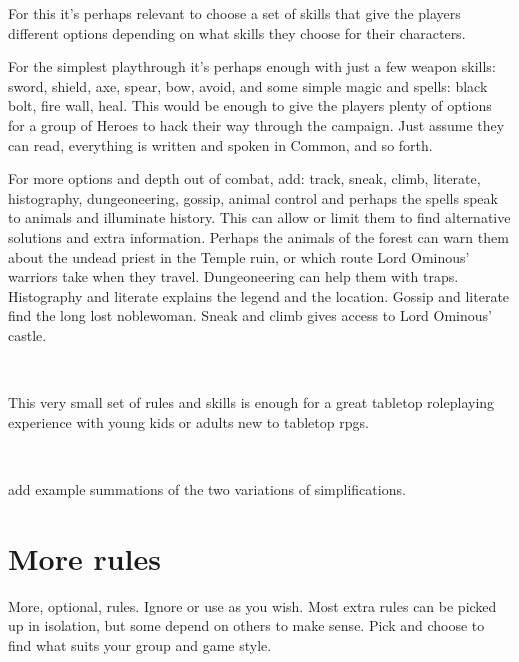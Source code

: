 For this it's perhaps relevant to choose a set of skills that give the players different options depending on what skills they choose for their characters. 

For the simplest playthrough it's perhaps enough with just a few weapon skills: sword, shield, axe, spear, bow, avoid, and some simple magic and spells: black bolt, fire wall, heal. This would be enough to give the players plenty of options for a group of Heroes to hack their way through the campaign. Just assume they can read, everything is written and spoken in Common, and so forth.

For more options and depth out of combat, add: track, sneak, climb, literate, histography, dungeoneering, gossip, animal control and perhaps the spells speak to animals and illuminate history. This can allow or limit them to find alternative solutions and extra information. Perhaps the animals of the forest can warn them about the undead priest in the Temple ruin, or which route Lord Ominous' warriors take when they travel. Dungeoneering can help them with traps. Histography and literate explains the legend and the location. Gossip and literate find the long lost noblewoman. Sneak and climb gives access to Lord Ominous' castle. 

\

\noindent This very small set of rules and skills is enough for a great tabletop roleplaying experience with young kids or adults new to tabletop rpgs.

\

\TODO add example summations of the two variations of simplifications.





\clearpage
\section*{More rules}

More, optional, rules. Ignore or use as you wish. Most extra rules can be picked up in isolation, but some depend on others to make sense. Pick and choose to find what suits your group and game style.



